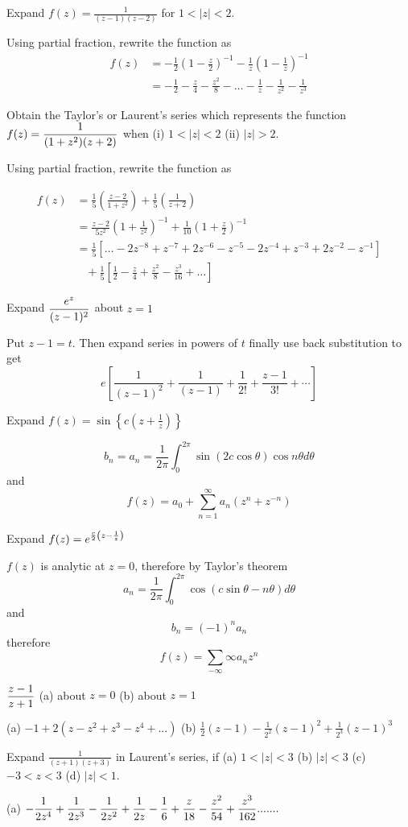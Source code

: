 \begin{problems}  
\prob Expand $f(z)= \frac{1}{(z-1)(z-2)}$ for $1<|z|<2$.
\begin{sol}
Using partial fraction, rewrite the function as
\begin{align*}
f(z) & =-\frac{1}{2}\left(1-\frac{z}{2}\right)^{-1}-\frac{1}{z}\left(1-\frac{1}{z}\right)^{-1}\\
 & =-\frac{1}{2}-\frac{z}{4}-\frac{z^{2}}{8}-\ldots-\frac{1}{z}-\frac{1}{z^{2}}-\frac{1}{z^{3}}
 \end{align*}
\end{sol}
\prob Obtain the Taylor's or Laurent's series which represents the function $\displaystyle f(z) = \frac{1}{(1+z^2)(z+2)}$ when (i) $1<|z|<2$ (ii) $|z| >2$.
\begin{sol}
Using partial fraction, rewrite the function as

\begin{align*}
f(z) & =\frac{1}{5}\left(\frac{z-2}{1+z^{2}}\right)+\frac{1}{5}\left(\frac{1}{z+2}\right)\\
 & =\frac{z-2}{5z^{2}}\left(1+\frac{1}{z^{2}}\right)^{-1}+\frac{1}{10}\left(1+\frac{z}{2}\right)^{-1}\\
 & =\frac{1}{5}\left[\ldots-2z^{-8}+z^{-7}+2z^{-6}-z^{-5}-2z^{-4}+z^{-3}+2z^{-2}-z^{-1}\right]\\
 & \;\;\;+\frac{1}{5}\left[\frac{1}{2}-\frac{z}{4}+\frac{z^{2}}{8}-\frac{z^{3}}{16}+\ldots\right]\end{align*}
\end{sol}
\prob Expand $\displaystyle \frac{e^z}{(z-1)^2}$ about $z=1$ 
\begin{sol}
Put $z-1=t$. Then expand series in powers of $t$ finally use back substitution to get
\[e\left[\frac{1}{(z-1)^2}+\frac{1}{(z-1)}+\frac{1}{2!}+\frac{z-1}{3!} + \cdots \right]\]
\end{sol}
\prob Expand $f(z) = \sin \left\{c\left(z+\frac{1}{z}\right)\right\}$
\begin{sol}
\[b_n = a_n = \frac{1}{2\pi}\int_0^{2\pi}\sin(2c \cos \theta)\cos n\theta d\theta\]
and
\[f(z) = a_0 + \sum_{n=1}^{\infty}a_{n}(z^{n}+z^{-n})\]
\end{sol}
\prob Expand $\displaystyle f(z) = e^{\frac{c}{2}\left(z-\frac{1}{z}\right)}$ \\
\begin{sol}
$f(z)$ is analytic at $z=0$, therefore by Taylor's theorem
\[a_n =\frac{1}{2\pi}\int_0^{2\pi}\cos(c\sin \theta -n\theta) d\theta \]
and
\[b_n = (-1)^n a_n\]
therefore
\[f(z) = \sum_{-\infty}{\infty} a_nz^n\]
\end{sol}
\prob $\displaystyle \frac{z-1}{z+1}$ (a) about $z=0$ (b) about $z=1$
\begin{sol}
(a) $-1+2(z-z^{2}+z^{3}-z^{4}+...)$ 
\noindent
(b) $\frac{1}{2}(z-1)-\frac{1}{2^{2}}(z-1)^{2}+\frac{1}{2^{3}}(z-1)^{3}$
\end{sol}
\prob Expand $\frac{1}{(z+1)(z+3)}$ in Laurent's series, if (a) $1<|z|<3$ (b) $|z|<3$ (c) $-3<z<3$ (d) $|z|<1$.
\begin{sol}
(a) $\displaystyle -\frac{1}{2z^{4}}+\frac{1}{2z^{3}}-\frac{1}{2z^{2}}+\frac{1}{2z}-\frac{1}{6}+\frac{z}{18}-\frac{z^{2}}{54}+\frac{z^{3}}{162}.......$


\end{sol}
\end{problems}
